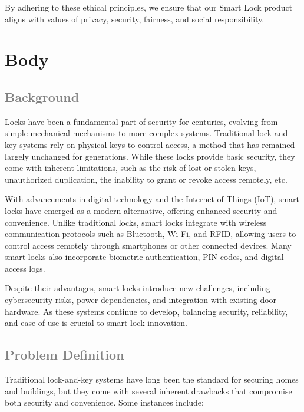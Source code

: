 \documentclass[a4paper,12pt]{report}
\begin{document}
By adhering to these ethical principles, we ensure that our Smart Lock product aligns with values of privacy, security, fairness, and social responsibility.


\tableofcontents

\newpage

\section{Body}
\subsection{\textcolor{gray}{Background}}
\noindent Locks have been a fundamental part of security for centuries, evolving from simple mechanical mechanisms to more complex systems. Traditional lock-and-key systems rely on physical keys to control access, a method that has remained largely unchanged for generations. While these locks provide basic security, they come with inherent limitations, such as the risk of lost or stolen keys, unauthorized duplication, the inability to grant or revoke access remotely, etc. \newline

\noindent With advancements in digital technology and the Internet of Things (IoT), smart locks have emerged as a modern alternative, offering enhanced security and convenience. Unlike traditional locks, smart locks integrate with wireless communication protocols such as Bluetooth, Wi-Fi, and RFID, allowing users to control access remotely through smartphones or other connected devices. Many smart locks also incorporate biometric authentication, PIN codes, and digital access logs. \newline

\noindent Despite their advantages, smart locks introduce new challenges, including cybersecurity risks, power dependencies, and integration with existing door hardware. As these systems continue to develop, balancing security, reliability, and ease of use is crucial to smart lock innovation.

\subsection{\textcolor{gray}{Problem Definition}}

Traditional lock-and-key systems have long been the standard for securing homes and buildings, but they come with several inherent drawbacks that compromise both security and convenience. Some instances include:
\end{document}
